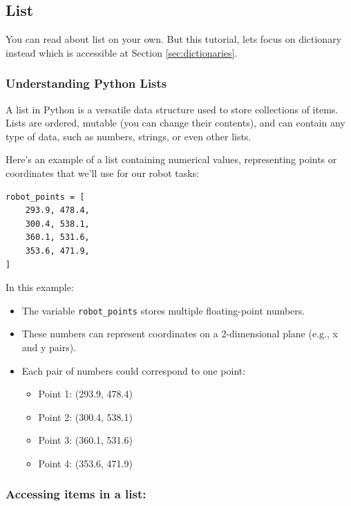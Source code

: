 \subsection{List}
\label{Sec:list}
You can read about list on your own. But this tutorial, lets focus on dictionary instead which is accessible at Section \ref{sec:dictionaries}.

\subsubsection{Understanding Python Lists}

A list in Python is a versatile data structure used to store collections of items. Lists are ordered, mutable (you can change their contents), and can contain any type of data, such as numbers, strings, or even other lists.

Here's an example of a list containing numerical values, representing points or coordinates that we'll use for our robot tasks:

\begin{verbatim}
robot_points = [
    293.9, 478.4,
    300.4, 538.1,
    360.1, 531.6,
    353.6, 471.9,
]
\end{verbatim}

In this example:

\begin{itemize}
    \item The variable \texttt{robot\_points} stores multiple floating-point numbers.
    \item These numbers can represent coordinates on a 2-dimensional plane (e.g., x and y pairs).
    \item Each pair of numbers could correspond to one point: 
    \begin{itemize}
        \item Point 1: (293.9, 478.4)
        \item Point 2: (300.4, 538.1)
        \item Point 3: (360.1, 531.6)
        \item Point 4: (353.6, 471.9)
    \end{itemize}
\end{itemize}

\subsubsection{Accessing items in a list:}
\label{sec:access_item_in_list}


